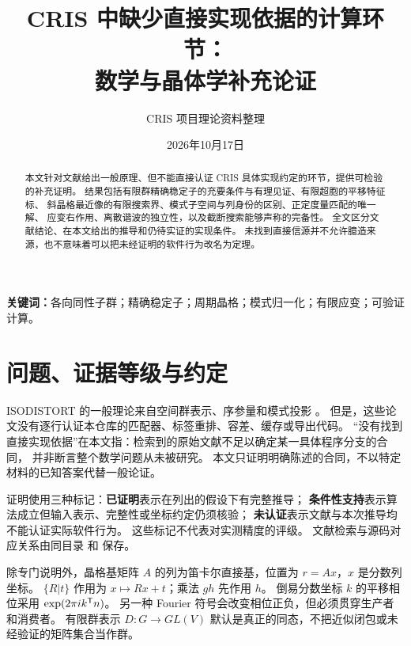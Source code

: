 
\title{CRIS 中缺少直接实现依据的计算环节：\\数学与晶体学补充论证}
\author{CRIS 项目理论资料整理}
\date{2026年10月17日}

\maketitle
\begin{abstract}
本文针对文献给出一般原理、但不能直接认证 CRIS 具体实现约定的环节，提供可检验的补充证明。
结果包括有限群精确稳定子的充要条件与有理见证、有限超胞的平移特征标、
斜晶格最近像的有限搜索界、模式子空间与列身份的区别、正定度量匹配的唯一解、
应变右作用、离散谐波的独立性，以及截断搜索能够声称的完备性。
全文区分文献结论、在本文给出的推导和仍待实证的实现条件。
未找到直接信源并不允许臆造来源，也不意味着可以把未经证明的软件行为改名为定理。
\end{abstract}
\noindent\textbf{关键词：}各向同性子群；精确稳定子；周期晶格；模式归一化；有限应变；可验证计算。
\par\scope
\clearpage
{\small\tableofcontents}
\clearpage

\section{问题、证据等级与约定}
ISODISTORT 的一般理论来自空间群表示、序参量和模式投影
\citep{Campbell2006,Stokes1991,Hatch2002,Stokes2017}。
但是，这些论文没有逐行认证本仓库的匹配器、标签重排、容差、缓存或导出代码。
“没有找到直接实现依据”在本文指：检索到的原始文献不足以确定某一具体程序分支的合同，
并非断言整个数学问题从未被研究。
本文只证明明确陈述的合同，不以特定材料的已知答案代替一般论证。

证明使用三种标记：\textbf{已证明}表示在列出的假设下有完整推导；
\textbf{条件性支持}表示算法成立但输入表示、完整性或坐标约定仍须核验；
\textbf{未认证}表示文献与本次推导均不能认证实际软件行为。
这些标记不代表对实测精度的评级。
文献检索与源码对应关系由同目录  和  保存。

除专门说明外，晶格基矩阵 $A$ 的列为笛卡尔直接基，位置为 $r=Ax$，$x$ 是分数列坐标。
$\{R|t\}$ 作用为 $x\mapsto Rx+t$；乘法 $gh$ 先作用 $h$。
倒易分数坐标 $k$ 的平移相位采用 $\exp(2\pi i k^\mathsf T n)$。
另一种 Fourier 符号会改变相位正负，但必须贯穿生产者和消费者。
有限群表示 $D:G\to GL(V)$ 默认是真正的同态，不把近似闭包或未经验证的矩阵集合当作群。

